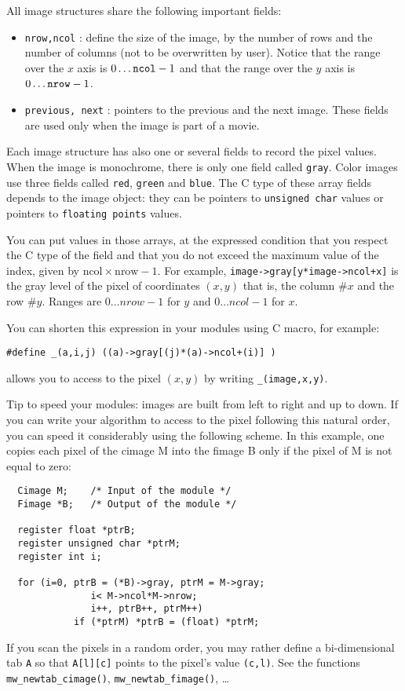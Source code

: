 %

All image structures share the following important fields:
\begin{itemize}
\item \verb+nrow,ncol+ : define the size of the image, by the number of
rows and the number of columns (not to be overwritten by user).
Notice that the range over the $x$ axis is $0 \ldots \verb+ncol+ -1$ and that
the range over the $y$ axis is $0 \ldots \verb+nrow+ -1$.
\item \verb+previous, next+ : pointers to the previous and the next image. These fields are used only when the image is part of a movie.
\end{itemize}

Each image structure has also one or several fields to record the pixel values.
When the image is monochrome, there is only one field called \verb+gray+.
Color images use three fields called \verb+red+, \verb+green+ and \verb+blue+.
The C type of these array fields depends to the image object: they can be pointers to \verb+unsigned char+ values or pointers to \verb+floating points+ values.

You can put values in those arrays, at the expressed condition that you respect
the C type of the field and that you do not exceed the maximum value of the 
index, given by $\mbox{ncol} \times \mbox{nrow} - 1$.
For example, \verb!image->gray[y*image->ncol+x]! is the gray level of the pixel of coordinates $(x,y)$ that is, the column $\#x$ and the row $\#y$.
Ranges are $0 \ldots nrow -1$ for $y$ and $0 \ldots ncol -1$ for $x$.

You can shorten this expression in your modules using C macro, for example:
{\small
\begin{verbatim}
#define _(a,i,j) ((a)->gray[(j)*(a)->ncol+(i)] )
\end{verbatim}
}
allows you to access to the pixel $(x,y)$ by writing \verb!_(image,x,y)!.

Tip to speed your modules: images are built from left to right and up to down.
If you can write your algorithm to access to the pixel following this natural order,
you can speed it considerably using the following scheme. In this example, one 
copies each pixel of the cimage M into the fimage B only if the pixel of M is not
equal to zero:
{\small
\begin{verbatim}
  Cimage M;    /* Input of the module */
  Fimage *B;   /* Output of the module */

  register float *ptrB;
  register unsigned char *ptrM;
  register int i;

  for (i=0, ptrB = (*B)->gray, ptrM = M->gray;
               i< M->ncol*M->nrow;
               i++, ptrB++, ptrM++)
            if (*ptrM) *ptrB = (float) *ptrM;
\end{verbatim}
}
If you scan the pixels in a random order, you may rather define a bi-dimensional
tab \verb+A+ so that \verb+A[l][c]+ points to the pixel's value \verb+(c,l)+.
See the functions \verb+mw_newtab_cimage()+, \verb+mw_newtab_fimage()+, \ldots


